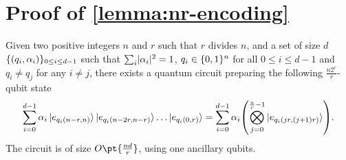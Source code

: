 \documentclass[a4paper,UKenglish,cleveref, autoref, thm-restate]{lipics-v2021}
\DeclarePairedDelimiter\rbra{\lparen}{\rparen}
\DeclarePairedDelimiter\cbra{\{}{\}}
\DeclarePairedDelimiter\abs{\lvert}{\rvert}
\newcommand{\bo}{O\pt}
\begin{document}


\appendix

\section{\texorpdfstring{Proof of \cref{lemma:nr-encoding}}{Proof of Lemma 9 }}\label{app:lemma-nr}

\begin{lemma}
    Given two positive integers $n$ and $r$ such that $r$ divides $n$, and a set of size $d$ $\cbra{(q_i, \alpha_i)}_{0 \leq i \leq d-1}$ such that $\sum_i \abs{\alpha_i}^2 = 1$, $q_i \in \cbra{0, 1}^n$ for all $0 \leq i \leq d-1$ and $q_i \neq q_j$ for any $i \neq j$, there exists a quantum circuit preparing the following $\frac{n2^r}{r}$-qubit state
    \begin{align}
        \sum_{i=0}^{d-1} \alpha_i \ket{e_{q_i(n-r, n)}} \ket{e_{q_i(n-2r, n-r)}} \dots \ket{e_{q_i(0, r)}}
        = \sum_{i=0}^{d-1} \alpha_i \rbra*{\bigotimes_{j=0}^{\frac{n}{r}-1} \ket{e_{q_i(jr, (j+1)r)}}}.
    \end{align}
    The circuit is of size $\bo{\frac{nd}{r}}$, using one ancillary qubits.
\end{lemma}
\end{document}
